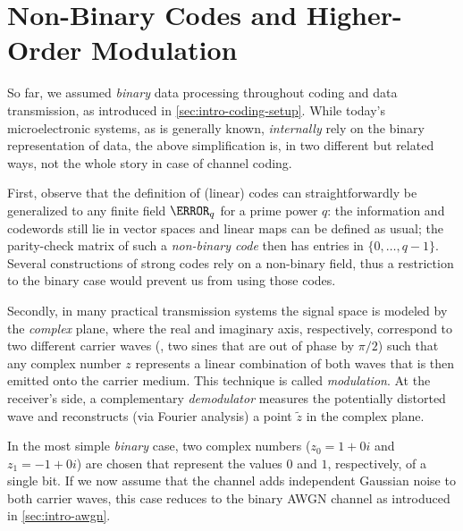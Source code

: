 \section{Non-Binary Codes and Higher-Order Modulation}\label{sec:intro-nonbinary}

So far, we assumed \emph{binary} data processing throughout coding and data transmission, as introduced in \cref{sec:intro-coding-setup}. While today's microelectronic systems, as is generally known, \emph{internally} rely on the binary representation of data, the above simplification is, in two different but related ways, not the whole story in case of channel coding.

First, observe that the definition of (linear) codes can straightforwardly be generalized to any finite field $\F_q$ for a prime power $q$: the information and codewords still lie in vector spaces and linear maps can be defined as usual; the parity-check matrix of such a \emph{non-binary code} then has entries in $\{0,\dotsc,q-1\}$. Several constructions of strong codes rely on a non-binary field, thus a restriction to the binary case would prevent us from using those codes.

Secondly, in many practical transmission systems the signal space is modeled by the \emph{complex} plane, where the real and imaginary axis, respectively, correspond to two different carrier waves (\eg, two sines that are out of phase by $π/2$) such that any complex number $z$ represents a linear combination of both waves that is then emitted onto the carrier medium. This technique is called \emph{modulation}. At the receiver's side, a complementary \emph{demodulator} measures the potentially distorted wave and reconstructs (\eg via Fourier analysis) a point $\tilde z$ in the complex plane.

In the most simple \emph{binary} case, two complex numbers (\eg $z_0=1+0i$ and $z_1=-1+0i$) are chosen that represent the values $0$ and $1$, respectively, of a single bit. If we now assume that the channel adds independent Gaussian noise to both carrier waves, this case reduces to the binary AWGN channel as introduced in \cref{sec:intro-awgn}.

